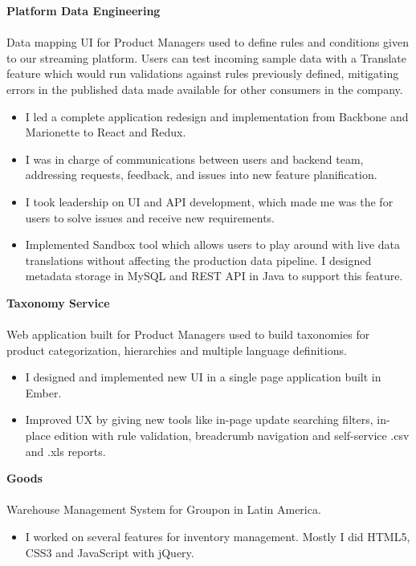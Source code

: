 \documentclass[line,letterpaper, 10pt]{res}
\begin{document}
\begin{resume}
	\textbf{Platform Data Engineering}\\ \\Data mapping UI for Product Managers used to define rules and conditions given to our streaming platform. Users can test incoming sample data with a Translate feature which would run validations against rules previously defined, mitigating errors in the published data made available for other consumers in the company.\\
	\begin{itemize} \itemsep 3pt
	\item I led a complete application redesign and implementation from Backbone and Marionette to React and Redux.
	\item I was in charge of communications between users and backend team, addressing requests, feedback, and issues into new feature planification.
	\item I took leadership on UI and API development, which made me was the for users to solve issues and receive new requirements.
	\item Implemented Sandbox tool which allows users to play around with live data translations without affecting the production data pipeline. I designed metadata storage in MySQL and REST API in Java to support this feature.
	\end{itemize}

	\textbf{Taxonomy Service}\\ \\Web application built for Product Managers used to build taxonomies for product categorization, hierarchies and multiple language definitions.\\
	\begin{itemize} \itemsep 3pt
	\item I designed and implemented new UI in a single page application built in Ember.
	\item Improved UX by giving new tools like in-page update searching filters, in-place edition with rule validation, breadcrumb navigation and self-service .csv and .xls reports.
	\end{itemize}

	\textbf{Goods}\\ \\ Warehouse Management System for Groupon in Latin America.\\
	\begin{itemize} \itemsep 3pt
	\item I worked on several features for inventory management. Mostly I did HTML5, CSS3 and JavaScript with jQuery.
	\end{itemize}


\end{resume}
\end{document}
